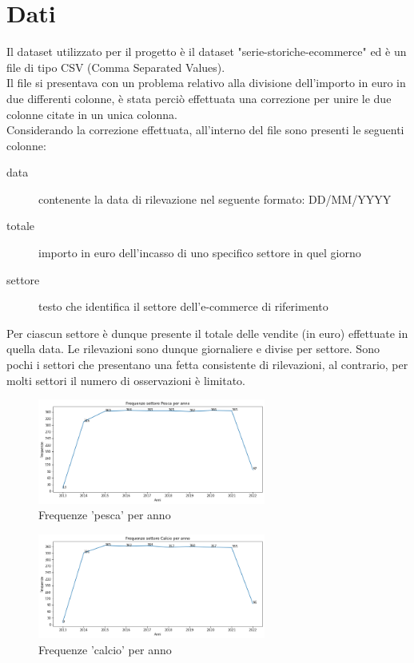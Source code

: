 \documentclass[12pt, a4paper, twocolumn]{article} %
\begin{document}
\section{Dati}
Il dataset utilizzato per il progetto è il dataset "serie-storiche-ecommerce" ed è un file di tipo CSV (Comma Separated Values).\\
Il file si presentava con un problema relativo alla divisione dell'importo in euro in due differenti colonne, è stata perciò effettuata una correzione per unire le due colonne citate in un unica colonna.\\
Considerando la correzione effettuata, all'interno del file sono presenti le seguenti colonne:
\begin{description}
	\item[data] contenente la data di rilevazione nel seguente formato: DD/MM/YYYY
	\item[totale] importo in euro dell'incasso di uno specifico settore in quel giorno
	\item[settore] testo che identifica il settore dell'e-commerce di riferimento
\end{description}
Per ciascun settore è dunque presente il totale delle vendite (in euro) effettuate in quella data. Le rilevazioni sono dunque giornaliere e divise per settore. Sono pochi i settori che presentano una fetta consistente di rilevazioni, al contrario, per molti settori il numero di osservazioni è limitato.\\
\begin{figure}[H]
  \caption{Frequenze 'pesca' per anno}
  \begin{center}
    \includegraphics[width=75mm,scale=0.5]{frequenze-pesca.png}
  \end{center}
\end{figure}
\begin{figure}[H]
  \caption{Frequenze 'calcio' per anno}
  \begin{center}
    \includegraphics[width=75mm,scale=0.5]{frequenze-calcio.png}
  \end{center}
\end{figure}
\end{document}

